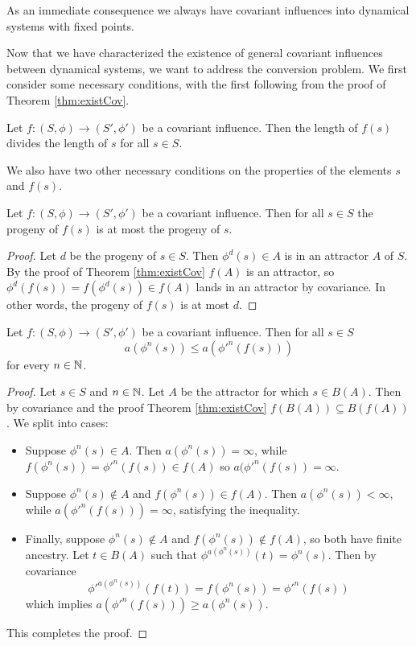 As an immediate consequence we always have covariant influences into dynamical systems with fixed points.

Now that we have characterized the existence of general covariant influences between dynamical systems, we want to address the conversion problem. We first consider some necessary conditions, with the first following from the proof of Theorem \ref{thm:existCov}.

\begin{lem}[label=lem:divide]
    Let $f:(S,\phi)\rightarrow (S',\phi')$ be a covariant influence. Then the length of $f(s)$ divides the length of $s$ for all $s \in S$.
\end{lem}

We also have two other necessary conditions on the properties of the elements $s$ and $f(s)$.

\begin{lem}[label=lem:progeny]
    Let $f:(S,\phi)\rightarrow (S',\phi')$ be a covariant influence. Then for all $s \in S$ the progeny of $f(s)$ is at most the progeny of $s$.
\end{lem}
\begin{proof}
    Let $d$ be the progeny of $s \in S$. Then $\phi^d(s) \in A$ is in an attractor $A$ of $S$. By the proof of Theorem \ref{thm:existCov} $f(A)$ is an attractor, so $\phi^d(f(s)) = f(\phi^d(s)) \in f(A)$ lands in an attractor by covariance. In other words, the progeny of $f(s)$ is at most $d$.
\end{proof}

\begin{lem}[label=lem:ancestor]
    Let $f:(S,\phi)\rightarrow (S',\phi')$ be a covariant influence. Then for all $s \in S$ 
    \begin{equation}
        a(\phi^n(s))\leq a({\phi'}^n(f(s)))
    \end{equation}
    for every $n \in \mathbb N$.
\end{lem}
\begin{proof}
    Let $s \in S$ and $n \in \mathbb N$. Let $A$ be the attractor for which $s\in B(A)$. Then by covariance and the proof Theorem \ref{thm:existCov} $f(B(A)) \subseteq B(f(A))$. We split into cases:
    \begin{itemize}
        \item Suppose $\phi^n(s) \in A$. Then $a(\phi^n(s)) = \infty$, while $f(\phi^n(s)) = {\phi'}^n(f(s)) \in f(A)$ so $a({\phi'}^n(f(s)) = \infty$.
        \item Suppose $\phi^n(s) \notin A$ and $f(\phi^n(s)) \in f(A)$. Then $a(\phi^n(s)) < \infty$, while $a({\phi'}^n(f(s))) = \infty$, satisfying the inequality.
        \item Finally, suppose $\phi^n(s) \notin A$ and $f(\phi^n(s)) \notin f(A)$, so both have finite ancestry. Let $t \in B(A)$ such that $\phi^{a(\phi^n(s))}(t) = \phi^n(s)$. Then by covariance $${\phi'}^{a(\phi^n(s))}(f(t)) = f(\phi^n(s)) = {\phi'}^n(f(s))$$
        which implies $a({\phi'}^n(f(s))) \geq a(\phi^n(s))$.
    \end{itemize}
    This completes the proof.
\end{proof}


